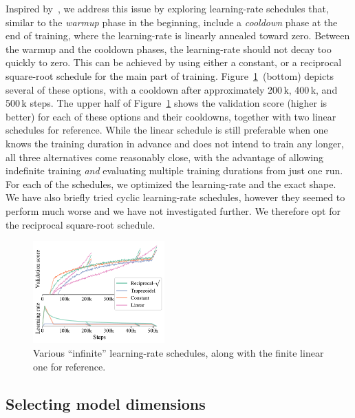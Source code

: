 Inspired by~\cite{instagram}, we address this issue by exploring learning-rate schedules that, similar to the \emph{warmup} phase in the beginning, include a \emph{cooldown} phase at the end of training, where the learning-rate is linearly annealed toward zero.
Between the warmup and the cooldown phases, the learning-rate should not decay too quickly to zero.
This can be achieved by using either a constant, or a reciprocal square-root schedule for the main part of training.
Figure~\ref{fig:schedules}~(bottom) depicts several of these options, with a cooldown after approximately 200\,k, 400\,k, and 500\,k steps.
The upper half of Figure~\ref{fig:schedules} shows the validation score (higher is better) for each of these options and their cooldowns, together with two linear schedules for reference.
While the linear schedule is still preferable when one knows the training duration in advance and does not intend to train any longer, all three alternatives come reasonably close, with the advantage of allowing indefinite training \emph{and} evaluating multiple training durations from just one run.
For each of the schedules, we optimized the learning-rate and the exact shape.
We have also briefly tried cyclic learning-rate schedules, however they seemed to perform much worse and we have not investigated further.
We therefore opt for the reciprocal square-root schedule.

\begin{figure}[t]
  \begin{center}
  \vspace{-0.5em}
    \includegraphics[width=0.45\textwidth]{figs/schedules.pdf}
  \end{center}
  \vspace{-1.2em}
  \caption{Various ``infinite'' learning-rate schedules, along with the finite linear one for reference.}\label{fig:schedules}
\end{figure}

\subsection{Selecting model dimensions}\label{sec:shape}


